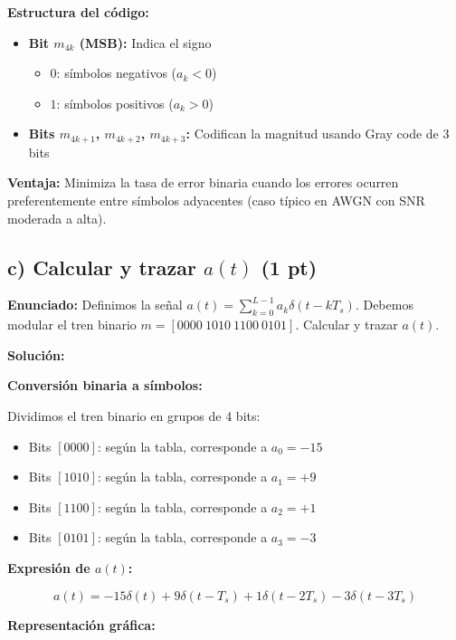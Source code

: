 \documentclass[11pt,a4paper]{article}
\begin{document}
\textbf{Estructura del c\'odigo:}

\begin{itemize}
    \item \textbf{Bit $m_{4k}$ (MSB):} Indica el signo
    \begin{itemize}
        \item $0$: s\'imbolos negativos ($a_k < 0$)
        \item $1$: s\'imbolos positivos ($a_k > 0$)
    \end{itemize}
    
    \item \textbf{Bits $m_{4k+1}$, $m_{4k+2}$, $m_{4k+3}$:} Codifican la magnitud usando Gray code de 3 bits
\end{itemize}

\textbf{Ventaja:} Minimiza la tasa de error binaria cuando los errores ocurren preferentemente entre s\'imbolos adyacentes (caso t\'ipico en AWGN con SNR moderada a alta).



\subsection*{c) Calcular y trazar $a(t)$ (1 pt)}

\textbf{Enunciado:} Definimos la se\~nal $a(t) = \sum_{k=0}^{L-1} a_k \delta(t - kT_s)$. Debemos modular el tren binario $m = [0000\ 1010\ 1100\ 0101]$. Calcular y trazar $a(t)$.

\vspace{0.3cm}
\textbf{Soluci\'on:}

\textbf{Conversi\'on binaria a s\'imbolos:}

Dividimos el tren binario en grupos de 4 bits:
\begin{itemize}
    \item Bits $[0000]$: seg\'un la tabla, corresponde a $a_0 = -15$
    \item Bits $[1010]$: seg\'un la tabla, corresponde a $a_1 = +9$
    \item Bits $[1100]$: seg\'un la tabla, corresponde a $a_2 = +1$
    \item Bits $[0101]$: seg\'un la tabla, corresponde a $a_3 = -3$
\end{itemize}

\textbf{Expresi\'on de $a(t)$:}

\[
\boxed{a(t) = -15\delta(t) + 9\delta(t - T_s) + 1\delta(t - 2T_s) - 3\delta(t - 3T_s)}
\]

\textbf{Representaci\'on gr\'afica:}
\end{document}
